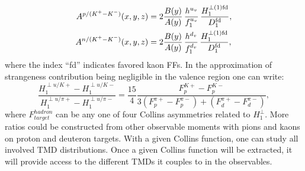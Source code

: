 \begin{align}
A^{p/(K^+-K^-)}(x,y,z) &= 2\frac{B(y)}{A(y)}\,
\frac{h^{u_v}}{f_1^{u_v}}\,\frac{H_1^{\perp (1) \rm{fd}} }
{D_1^{\rm{fd}}},
\\
A^{n/(K^+-K^-)}(x,y,z) &= 2\frac{B(y)}{A(y)}\,
\frac{h^{d_v}}{f_1^{d_v}}\,\frac{H_1^{\perp (1) \rm{fd}} }
{D_1^{\rm{fd}}},
\end{align}
%
\noindent where the index ``fd'' indicates favored kaon FFs.
In the approximation of strangeness contribution being negligible
in the valence region one can write:
\begin{equation}
 \frac{H_1^{\perp u/K+}- H_1^{\perp u/K-}}{H_1^{\perp u/\pi +}- H_1^{\perp u/\pi -}}  = \frac{15}{4}
\frac{F_p^{K+} - F_p^{K-}}{3(F_p^{\pi +}-F_p^{\pi -}) + (F_d^{\pi +}-F_d^{\pi -})},
\end{equation}
%
\noindent where $F_{target}^{hadron}$ can be any one of four Collins asymmetries
related to $H_1^\perp$.
%
More ratios could be constructed from other observable moments with pions and kaons on proton and
deuteron targets. With a given Collins function, one can study all involved TMD distributions.
Once a given Collins function will be extracted, it will provide access to the different TMDs it couples to in the observables. 
%
